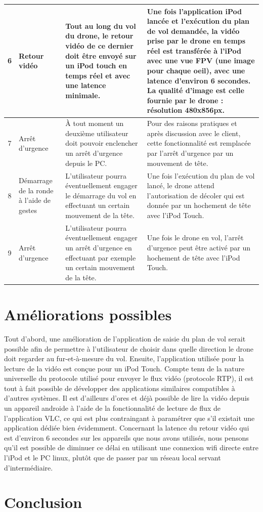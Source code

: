 \documentclass{article}
\begin{document}
\begin{center}
\begin{tabularx}{15cm}{|c|p{3cm}|p{5cm}||X|}
            \hline
            6 & Retour vidéo  & Tout au long du vol du drone, le retour vidéo de ce dernier doit être envoyé sur un iPod touch en temps réel et avec une latence minimale. & Une fois l'application iPod lancée et l'exécution du plan de vol demandée, la vidéo prise par le drone en temps réel est transférée à l'iPod avec une vue FPV (une image pour chaque oeil), avec une latence d'environ 6 secondes. La qualité d'image est celle fournie par le drone : résolution 480x856px. \\
            \hline
            7 & Arrêt d'urgence  & À tout moment un deuxième utilisateur doit pouvoir enclencher un arrêt d'urgence depuis le PC. & Pour des raisons pratiques et après discussion avec le client, cette fonctionnalité est remplacée par l'arrêt d'urgence par un mouvement de tête.\\
            \hline
            8 & Démarrage de la ronde à l'aide de gestes & L'utilisateur pourra éventuellement engager le démarrage du vol en effectuant un certain mouvement de la tête. & Une fois l'exécution du plan de vol lancé, le drone attend l'autorisation de décoler qui est donnée par un hochement de tête avec l'iPod Touch.	\\
			\hline
			9 & Arrêt d'urgence & L'utilisateur pourra éventuellement engager un arrêt d'urgence en effectuant par exemple un certain mouvement de la tête. & Une fois le drone en vol, l'arrêt d'urgence peut être activé par un hochement de tête avec l'iPod Touch.	\\
			\hline
        \end{tabularx}
        \end{center}
	
\newpage
\section{Améliorations possibles}
Tout d'abord, une amélioration de l'application de saisie du plan de vol serait possible afin de permettre à l'utilisateur de choisir dans quelle direction le drone doit regarder au fur-et-à-mesure du vol.
\medbreak
Ensuite, l'application utilisée pour la lecture de la vidéo est conçue pour un iPod Touch. Compte tenu de la nature universelle du protocole utilisé pour envoyer le flux vidéo (protocole RTP), il est tout à fait possible de développer des applications similaires compatibles à d'autres systèmes. Il est d'ailleurs d'ores et déjà possible de lire la vidéo depuis un appareil androide à l'aide de la fonctionnalité de lecture de flux de l'application VLC, ce qui est plus contraingant à paramétrer que s'il existait une application dédiée bien évidemment.
\medbreak
Concernant la latence du retour vidéo qui est d'environ 6 secondes sur les appareils que nous avons utilisés, nous pensons qu'il est possible de diminuer ce délai en utilisant une connexion wifi directe entre l'iPod et le PC linux, plutôt que de passer par un réseau local servant d'intermédiaire.

\newpage
\section{Conclusion}
	
 
\end{document}
